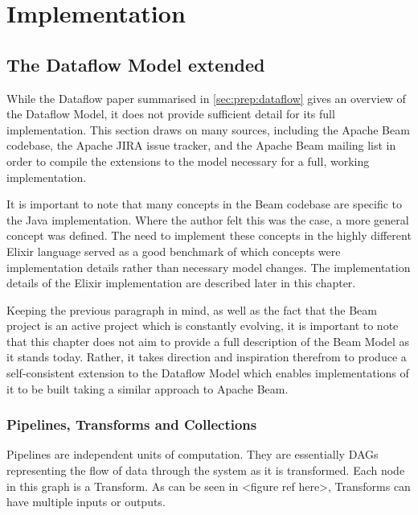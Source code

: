\chapter{Implementation}\label{ch:impl}

\section{The Dataflow Model extended}\label{sec:impl:dataflow}

While the Dataflow paper \cite{Akidau:2015} summarised in \cref{sec:prep:dataflow} gives an overview of the Dataflow Model, it does not provide sufficient detail for its full implementation.
This section draws on many sources, including the Apache Beam codebase, the Apache JIRA issue tracker, and the Apache Beam mailing list in order to compile the extensions to the model necessary for a full, working implementation.

It is important to note that many concepts in the Beam codebase are specific to the Java implementation.
Where the author felt this was the case, a more general concept was defined.
The need to implement these concepts in the highly different Elixir language served as a good benchmark of which concepts were implementation details rather than necessary model changes.
The implementation details of the Elixir implementation are described later in this chapter.

Keeping the previous paragraph in mind, as well as the fact that the Beam project is an active project which is constantly evolving, it is important to note that this chapter does not aim to provide a full description of the Beam Model as it stands today.
Rather, it takes direction and inspiration therefrom to produce a self-consistent extension to the Dataflow Model which enables implementations of it to be built taking a similar approach to Apache Beam.


\subsection{Pipelines, Transforms and Collections}


Pipelines are independent units of computation.
They are essentially DAGs representing the flow of data through the system as it is transformed.
Each node in this graph is a Transform\footnotemark.
As can be seen in <figure ref here>, Transforms can have multiple inputs or outputs.


